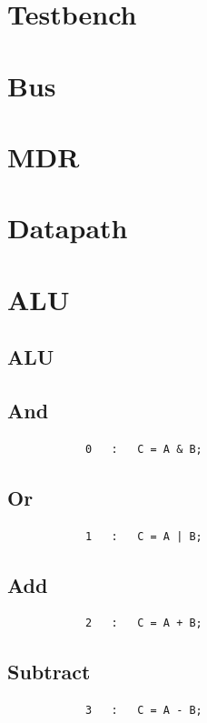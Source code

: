 \documentclass{article}
\begin{document}
\appendix
\section{Testbench} \label{Testbench}
    
\section{Bus} \label{Bus}
    
\section{MDR}\label{MDR}
    
\section{Datapath} \label{Datapath}
    
\section{ALU} \label{ALU}
    \subsection{ALU}
        
    \subsection{And}
        \begin{lstlisting}
            0   :   C = A & B;
        \end{lstlisting}
    \subsection{Or}
        \begin{lstlisting}
			1   :   C = A | B;
        \end{lstlisting}
    \subsection{Add}
        \begin{lstlisting}
            2   :   C = A + B;
        \end{lstlisting}
    \subsection{Subtract}
        \begin{lstlisting}
			3   :   C = A - B;
        \end{lstlisting}
\end{document}
